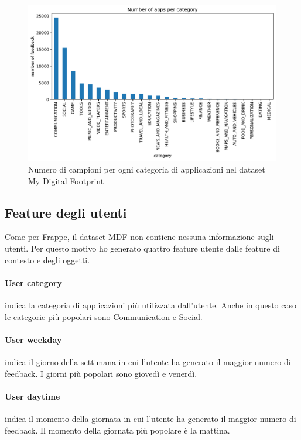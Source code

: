 \documentclass[12pt,italian]{report}
\begin{document}
\begin{figure}
  \centering
  \includegraphics[width=\linewidth]{immagini/mdf-category.pdf}
  \caption{Numero di campioni per ogni categoria di applicazioni nel dataset My Digital Footprint}
  \label{fig:mdf-categories}
\end{figure}

\subsection{Feature degli utenti}
Come per Frappe, il dataset MDF non contiene nessuna informazione sugli utenti. Per questo motivo ho generato quattro feature utente dalle feature di contesto e degli oggetti.

\paragraph{User category} indica la categoria di applicazioni più utilizzata dall'utente. Anche in questo caso le categorie più popolari sono Communication e Social.

\paragraph{User weekday} indica il giorno della settimana in cui l'utente ha generato il maggior numero di feedback. I giorni più popolari sono giovedì e venerdì.

\paragraph{User daytime} indica il momento della giornata in cui l'utente ha generato il maggior numero di feedback. Il momento della giornata più popolare è la mattina.
\end{document}
